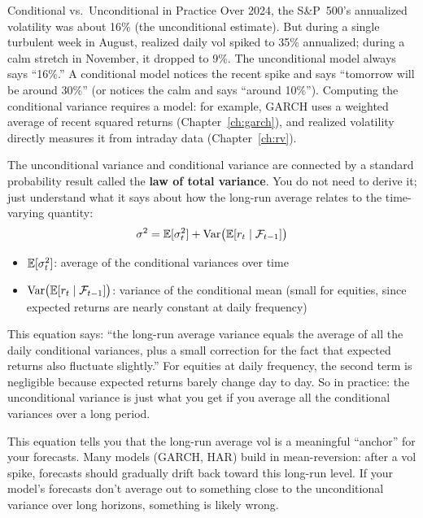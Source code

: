 \begin{workedexample}{Conditional vs.\ Unconditional in Practice}
Over 2024, the S\&P~500's annualized volatility was about 16\% (the unconditional estimate).
But during a single turbulent week in August, realized daily vol spiked to 35\% annualized; during a calm stretch in November, it dropped to 9\%.
The unconditional model always says ``16\%.'' A conditional model notices the recent spike and says ``tomorrow will be around 30\%'' (or notices the calm and says ``around 10\%'').
Computing the conditional variance requires a model: for example, GARCH uses a weighted average of recent squared returns (Chapter~\ref{ch:garch}), and realized volatility directly measures it from intraday data (Chapter~\ref{ch:rv}).
\end{workedexample}

The unconditional variance and conditional variance are connected by a standard probability result called the \textbf{law of total variance}.
You do not need to derive it; just understand what it says about how the long-run average relates to the time-varying quantity:
\begin{equation}
  \sigma^2 = \mathbb{E}[\sigma_t^2] + \operatorname{Var}\bigl(\mathbb{E}[r_t \mid \mathcal{F}_{t-1}]\bigr)
  \label{eq:total-variance}
\end{equation}
\begin{itemize}[nosep]
  \item $\mathbb{E}[\sigma_t^2]$: average of the conditional variances over time
  \item $\operatorname{Var}\bigl(\mathbb{E}[r_t \mid \mathcal{F}_{t-1}]\bigr)$: variance of the conditional mean (small for equities, since expected returns are nearly constant at daily frequency)
\end{itemize}

\begin{intuition}
This equation says: ``the long-run average variance equals the average of all the daily conditional variances, plus a small correction for the fact that expected returns also fluctuate slightly.''
For equities at daily frequency, the second term is negligible because expected returns barely change day to day.
So in practice: the unconditional variance is just what you get if you average all the conditional variances over a long period.
\end{intuition}

\begin{projectconnection}
This equation tells you that the long-run average vol is a meaningful ``anchor'' for your forecasts.
Many models (GARCH, HAR) build in mean-reversion: after a vol spike, forecasts should gradually drift back toward this long-run level.
If your model's forecasts don't average out to something close to the unconditional variance over long horizons, something is likely wrong.
\end{projectconnection}


